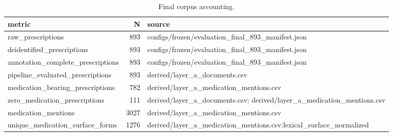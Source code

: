 \begin{table}
\caption{Final corpus accounting.}
\begin{tabular}{lrl}
\toprule
metric & N & source \\
\midrule
raw\_prescriptions & 893 & configs/frozen/evaluation\_final\_893\_manifest.json \\
deidentified\_prescriptions & 893 & configs/frozen/evaluation\_final\_893\_manifest.json \\
annotation\_complete\_prescriptions & 893 & configs/frozen/evaluation\_final\_893\_manifest.json \\
pipeline\_evaluated\_prescriptions & 893 & derived/layer\_a\_documents.csv \\
medication\_bearing\_prescriptions & 782 & derived/layer\_a\_medication\_mentions.csv \\
zero\_medication\_prescriptions & 111 & derived/layer\_a\_documents.csv; derived/layer\_a\_medication\_mentions.csv \\
medication\_mentions & 3027 & derived/layer\_a\_medication\_mentions.csv \\
unique\_medication\_surface\_forms & 1276 & derived/layer\_a\_medication\_mentions.csv:lexical\_surface\_normalized \\
\bottomrule
\end{tabular}
\end{table}
